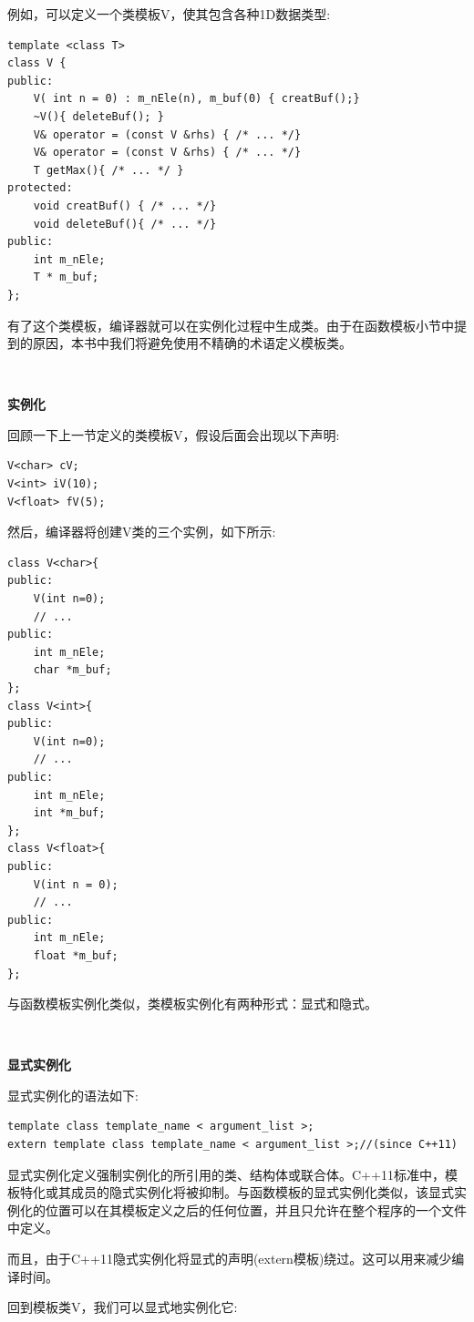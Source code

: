 例如，可以定义一个类模板V，使其包含各种1D数据类型:\par

\begin{lstlisting}[caption={}]
template <class T>
class V {
public:
	V( int n = 0) : m_nEle(n), m_buf(0) { creatBuf();}
	~V(){ deleteBuf(); }
	V& operator = (const V &rhs) { /* ... */}
	V& operator = (const V &rhs) { /* ... */}
	T getMax(){ /* ... */ }
protected:
	void creatBuf() { /* ... */}
	void deleteBuf(){ /* ... */}
public:
	int m_nEle;
	T * m_buf;
};
\end{lstlisting}

有了这个类模板，编译器就可以在实例化过程中生成类。由于在函数模板小节中提到的原因，本书中我们将避免使用不精确的术语定义模板类。 \par

\noindent\textbf{}\ \par
\textbf{实例化} \ \par
回顾一下上一节定义的类模板V，假设后面会出现以下声明: \par

\begin{lstlisting}[caption={}]
V<char> cV;
V<int> iV(10);
V<float> fV(5);
\end{lstlisting}

然后，编译器将创建V类的三个实例，如下所示: \par

\begin{lstlisting}[caption={}]
class V<char>{
public:
	V(int n=0);
	// ...
public:
	int m_nEle;
	char *m_buf;
};
class V<int>{
public:
	V(int n=0);
	// ...
public:
	int m_nEle;
	int *m_buf;
};
class V<float>{
public:
	V(int n = 0);
	// ...
public:
	int m_nEle;
	float *m_buf;
};
\end{lstlisting}

与函数模板实例化类似，类模板实例化有两种形式：显式和隐式。 \par

\noindent\textbf{}\ \par
\textbf{显式实例化} \ \par
显式实例化的语法如下: \par

\begin{lstlisting}[caption={}]
template class template_name < argument_list >;
extern template class template_name < argument_list >;//(since C++11)
\end{lstlisting}

显式实例化定义强制实例化的所引用的类、结构体或联合体。C++11标准中，模板特化或其成员的隐式实例化将被抑制。与函数模板的显式实例化类似，该显式实例化的位置可以在其模板定义之后的任何位置，并且只允许在整个程序的一个文件中定义。\par
而且，由于C++11隐式实例化将显式的声明(extern模板)绕过。这可以用来减少编译时间。 \par 
回到模板类V，我们可以显式地实例化它: \par

